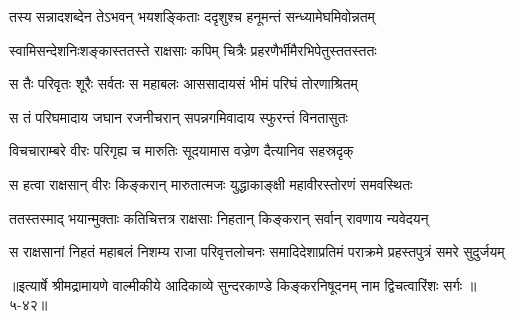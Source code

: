 \twolineshloka
{तस्य सन्नादशब्देन तेऽभवन् भयशङ्किताः}
{ददृशुश्च हनूमन्तं सन्ध्यामेघमिवोन्नतम्} %

\twolineshloka
{स्वामिसन्देशनिःशङ्कास्ततस्ते राक्षसाः कपिम्}
{चित्रैः प्रहरणैर्भीमैरभिपेतुस्ततस्ततः} %

\twolineshloka
{स तैः परिवृतः शूरैः सर्वतः स महाबलः}
{आससादायसं भीमं परिघं तोरणाश्रितम्} %

\twolineshloka
{स तं परिघमादाय जघान रजनीचरान्}
{सपन्नगमिवादाय स्फुरन्तं विनतासुतः} %

\twolineshloka
{विचचाराम्बरे वीरः परिगृह्य च मारुतिः}
{सूदयामास वज्रेण दैत्यानिव सहस्रदृक्} %

\twolineshloka
{स हत्वा राक्षसान् वीरः किङ्करान् मारुतात्मजः}
{युद्धाकाङ्क्षी महावीरस्तोरणं समवस्थितः} %

\twolineshloka
{ततस्तस्माद् भयान्मुक्ताः कतिचित्तत्र राक्षसाः}
{निहतान् किङ्करान् सर्वान् रावणाय न्यवेदयन्} %

\twolineshloka
{स राक्षसानां निहतं महाबलं निशम्य राजा परिवृत्तलोचनः}
{समादिदेशाप्रतिमं पराक्रमे प्रहस्तपुत्रं समरे सुदुर्जयम्} %


॥इत्यार्षे श्रीमद्रामायणे वाल्मीकीये आदिकाव्ये सुन्दरकाण्डे किङ्करनिषूदनम् नाम द्विचत्वारिंशः सर्गः ॥५-४२॥
